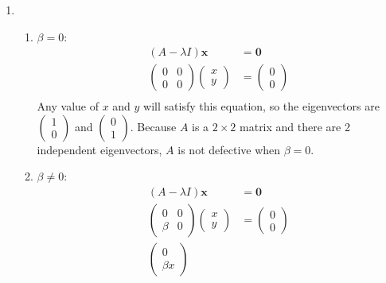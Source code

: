 \documentclass[10pt]{article}
\begin{document}
\begin{enumerate}
\begin{enumerate}
            \item
              \begin{enumerate}
                  \item $\beta = 0$:
                    \begin{align*}
                      (A - \lambda I)\mathbf{x} &= \mathbf{0} \\
                      \begin{pmatrix} 0 & 0 \\ 0 & 0 \end{pmatrix}
                      \begin{pmatrix} x \\ y \end{pmatrix}
                        &=
                      \begin{pmatrix} 0 \\ 0 \end{pmatrix} \\
                    \end{align*}
                  Any value of $x$ and $y$ will satisfy this equation, so the eigenvectors are 
                      $\begin{pmatrix} 1 \\ 0 \end{pmatrix}$ and
                      $\begin{pmatrix} 0 \\ 1 \end{pmatrix}$. Because $A$ is a
                        $2\times 2$ matrix and there are 2 independent
                        eigenvectors, $A$ is not defective when $\beta = 0$.
                  \item $\beta \not= 0$:
                    \begin{align*}
                      (A - \lambda I)\mathbf{x} &= \mathbf{0} \\
                      \begin{pmatrix} 0 & 0 \\ \beta & 0 \end{pmatrix}
                      \begin{pmatrix} x \\ y \end{pmatrix}
                        &=
                      \begin{pmatrix} 0 \\ 0 \end{pmatrix} \\
                      \begin{pmatrix} 0 \\ \beta x \end{pmatrix}

\end{align*}
\end{enumerate}
\end{enumerate}
\end{enumerate}
\end{document}
